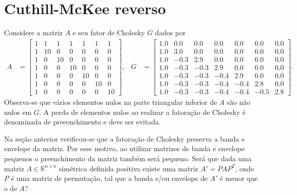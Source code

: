 \section{Cuthill-McKee reverso}
Considere a matriz $A$ e seu fator de Cholesky $G$ dados por
\begin{align*}
    A &= \begin{bmatrix}
        1 &  1 &  1 &  1 &  1 &  1 &  1 \\
        1 & 10 &  0 &  0 &  0 &  0 &  0 \\
        1 &  0 & 10 &  0 &  0 &  0 &  0 \\
        1 &  0 &  0 & 10 &  0 &  0 &  0 \\
        1 &  0 &  0 &  0 & 10 &  0 &  0 \\
        1 &  0 &  0 &  0 &  0 & 10 &  0 \\
        1 &  0 &  0 &  0 &  0 &  0 & 10
    \end{bmatrix}, & G &= \begin{bmatrix}
        1.0 &  0.0 &  0.0 &  0.0 &  0.0 &  0.0 &  0.0 \\
        1.0 &  3.0 &  0.0 &  0.0 &  0.0 &  0.0 &  0.0 \\
        1.0 & -0.3 &  2.9 &  0.0 &  0.0 &  0.0 &  0.0 \\
        1.0 & -0.3 & -0.3 &  2.9 &  0.0 &  0.0 &  0.0 \\
        1.0 & -0.3 & -0.3 & -0.4 &  2.9 &  0.0 &  0.0 \\
        1.0 & -0.3 & -0.3 & -0.4 & -0.4 &  2.8 &  0.0 \\
        1.0 & -0.3 & -0.3 & -0.4 & -0.4 & -0.5 &  2.8
    \end{bmatrix}.
\end{align*}
Observa-se que vários elementos nulos na parte triangular inferior de $A$ são
não nulos em $G$. A perda de elementos nulos ao realizar a fatoração de
Cholesky é denominada de preeenchimento e deve ser evitada.

Na seção anterior verificou-se que a fatoração de Cholesky preserva a banda e
envelope da matriz. Por esse motivo, ao utilizar matrizes de banda e
envelope pequenos o preenchimento da matriz também será pequeno. Será que dada
uma matriz $A \in \mathbb{R}^{n \times n}$ simétrica definida positiva existe
uma matriz $A' = P A P^T$, onde $P$ é uma matriz de permutação, tal que a banda
e/ou envelope de $A'$ é menor que o de $A$?

